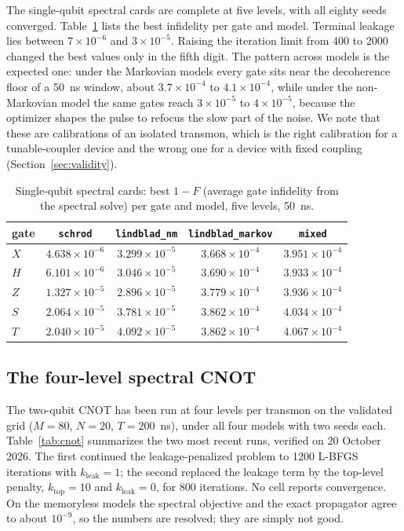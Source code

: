 \documentclass[10pt]{article}
\begin{document}
The single-qubit spectral cards are complete at five levels, with all eighty
seeds converged. Table~\ref{tab:1q} lists the best infidelity per gate and
model. Terminal leakage lies between $7\times10^{-6}$ and $3\times10^{-5}$.
Raising the iteration limit from 400 to 2000 changed the best values only in
the fifth digit. The pattern across models is the expected one: under the
Markovian models every gate sits near the decoherence floor of a 50~ns window,
about $3.7\times10^{-4}$ to $4.1\times10^{-4}$, while under the non-Markovian
model the same gates reach $3\times10^{-5}$ to $4\times10^{-5}$, because the
optimizer shapes the pulse to refocus the slow part of the noise. We note that
these are calibrations of an isolated transmon, which is the right calibration
for a tunable-coupler device and the wrong one for a device with fixed
coupling (Section~\ref{sec:validity}).

\begin{table}[htbp]
\centering
\caption{Single-qubit spectral cards: best $1 - F$ (average gate infidelity
from the spectral solve) per gate and model, five levels, 50~ns.}
\label{tab:1q}
\small
\begin{tabular}{lcccc}
\toprule
gate & \texttt{schrod} & \texttt{lindblad\_nm} & \texttt{lindblad\_markov} & \texttt{mixed} \\
\midrule
$X$ & $4.638\times10^{-6}$ & $3.299\times10^{-5}$ & $3.668\times10^{-4}$ & $3.951\times10^{-4}$ \\
$H$ & $6.101\times10^{-6}$ & $3.046\times10^{-5}$ & $3.690\times10^{-4}$ & $3.933\times10^{-4}$ \\
$Z$ & $1.327\times10^{-5}$ & $2.896\times10^{-5}$ & $3.779\times10^{-4}$ & $3.936\times10^{-4}$ \\
$S$ & $2.064\times10^{-5}$ & $3.781\times10^{-5}$ & $3.862\times10^{-4}$ & $4.034\times10^{-4}$ \\
$T$ & $2.040\times10^{-5}$ & $4.092\times10^{-5}$ & $3.862\times10^{-4}$ & $4.067\times10^{-4}$ \\
\bottomrule
\end{tabular}
\end{table}

\subsection{The four-level spectral CNOT}
\label{sec:cnotstatus}

The two-qubit CNOT has been run at four levels per transmon on the validated
grid ($M = 80$, $N = 20$, $T = 200$~ns), under all four models with two seeds
each. Table~\ref{tab:cnot} summarizes the two most recent runs, verified on
20 October 2026. The first continued the leakage-penalized problem to 1200
L-BFGS iterations with $k_{\mathrm{leak}} = 1$; the second replaced the leakage
term by the top-level penalty, $k_{\mathrm{top}} = 10$ and
$k_{\mathrm{leak}} = 0$, for 800 iterations. No cell reports convergence. On
the memoryless models the spectral objective and the exact propagator agree to
about $10^{-9}$, so the numbers are resolved; they are simply not good.
\end{document}

